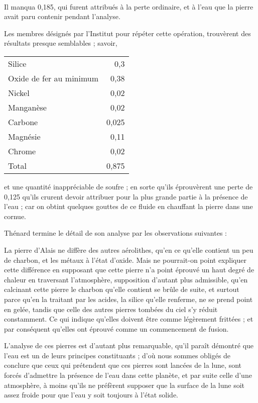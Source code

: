 \documentclass[a4paper, 12pt, oneside, french]{article}
\begin{document}
\paragraph{}
Il manqua 0,185, qui furent attribués à la perte ordinaire, et à l'eau que la pierre avait paru contenir pendant l'analyse.

Les membres désignés par l'Institut pour répéter cette opération, trouvèrent des résultats presque semblables ; savoir,
\begin{table}[H]
    \centering
    \Fontauri
    \large
    \begin{tabular}{l r}
        Silice & 0,3 \\
        Oxide de fer au minimum & 0,38 \\
        Nickel & 0,02 \\
        Manganèse & 0,02 \\
        Carbone & 0,025 \\
        Magnésie & 0,11 \\
        Chrome & 0,02 \\ \hline
        Total & 0,875 \\
    \end{tabular}
\end{table}
et une quantité inappréciable de soufre ; en sorte qu'ils éprouvèrent une perte de 0,125 qu'ils crurent devoir attribuer pour la plus grande partie à la présence de l'eau ; car on obtint quelques gouttes de ce fluide en chauffant la pierre dans une cornue.

Thénard termine le détail de son analyse par les observations suivantes :

\og La pierre d'Alais ne diffère des autres aérolithes, qu'en ce qu'elle contient un peu de charbon, et les métaux à l'état d'oxide. Mais ne pourrait-on point expliquer cette différence en supposant que cette pierre n'a point éprouvé un haut degré de chaleur en traversant l'atmosphère, supposition d'autant plus admissible, qu'en calcinant cette pierre le charbon qu'elle contient se brûle de suite, et surtout parce qu'en la traitant par les acides, la silice qu'elle renferme, ne se prend point en gelée, tandis que celle des autres pierres tombées du ciel s'y réduit constamment. Ce qui indique qu'elles doivent être comme légèrement frittées ; et par conséquent qu'elles ont éprouvé comme un commencement de fusion. \fg

L'analyse de ces pierres est d'autant plus remarquable, qu'il paraît démontré que l'eau est un de leurs principes constituants ; d'où nous sommes obligés de conclure que ceux qui prétendent que ces pierres sont lancées de la lune, sont forcés d'admettre la présence de l'eau dans cette planète, et par suite celle d'une atmosphère, à moins qu'ils ne préfèrent supposer que la surface de la lune soit assez froide pour que l'eau y soit toujours à l'état solide.
\end{document}
